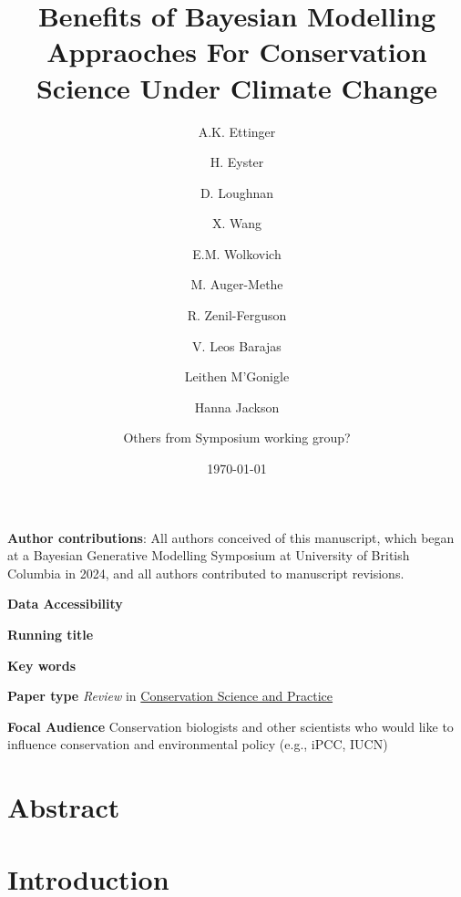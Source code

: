 \documentclass{article}
\begin{document}



\title{Benefits of Bayesian Modelling Appraoches For Conservation Science Under Climate Change} 
\author[1,a]{A.K. Ettinger}
\author[2]{H. Eyster}
\author[3]{D. Loughnan}
\author[3]{X. Wang}
\author[3]{E.M. Wolkovich}
\author[3]{M. Auger-Methe}
\author[4]{R. Zenil-Ferguson}
\author[5]{V. Leos Barajas}
\author[6]{Leithen M'Gonigle}
\author[6]{Hanna Jackson}
\author[7]{Others from Symposium working group?}





\date{\today}
\maketitle 
\textbf{Author contributions}: All authors conceived of this manuscript, which began at a Bayesian Generative Modelling Symposium at University of British Columbia in 2024, and all authors contributed to manuscript revisions.

\textbf{Data Accessibility} 

\textbf{Running title} 

\textbf{Key words} 


\textbf{Paper type} \textit{Review} in \href{https://conbio.onlinelibrary.wiley.com/hub/journal/25784854/homepage/author-guidelines}{Conservation Science and Practice} 

\textbf{Focal Audience} Conservation biologists and other scientists who would like to influence conservation and environmental policy (e.g., iPCC, IUCN)






\section*{Abstract} 


\newpage
\section* {Introduction}
\end{document}
